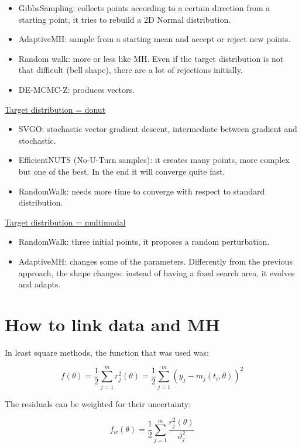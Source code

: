   \begin{itemize}
  \tightlist
  \item
    GibbsSampling: collects points according to a certain direction from a
    starting point, it tries to rebuild a 2D Normal distribution.
  \item
    AdaptiveMH: sample from a starting mean and accept or reject new
    points.
  \item
    Random walk: more or less like MH. Even if the target distribution is
    not that difficult (bell shape), there are a lot of rejections
    initially.
  \item
    DE-MCMC-Z: produces vectors.
  \end{itemize}
  \noindent
  \underline{Target distribution = donut}

  \begin{itemize}
  \tightlist
  \item
    SVGO: stochastic vector gradient descent, intermediate between
    gradient and stochastic.
  \item
    EfficientNUTS (No-U-Turn samples): it creates many points, more
    complex but one of the best. In the end it will converge quite fast.
  \item
    RandomWalk: needs more time to converge with respect to standard
    distribution.
  \end{itemize}
  \noindent
  \underline{Target distribution = multimodal}

  \begin{itemize}
  \tightlist
  \item
    RandomWalk: three initial points, it proposes a random perturbation.
  \item
    AdaptiveMH: changes some of the parameters. Differently from the
    previous approach, the shape changes: instead of having a fixed search
    area, it evolves and adapts.
  \end{itemize}


\section{How to link data and MH}
In least square methods, the function that was used was:

$$f(\theta)=\frac{1}{2}\sum^m_{j=1}r^2_j(\theta)=\frac{1}{2}\sum^m_{j=1}(y_j-m_j(t_i,\theta))^2$$

The residuals can be weighted for their uncertainty:

$$f_w(\theta)=\frac{1}{2}\sum^m_{j=1} \frac{r^2_j(\theta)}{\vartheta_j^2}$$

